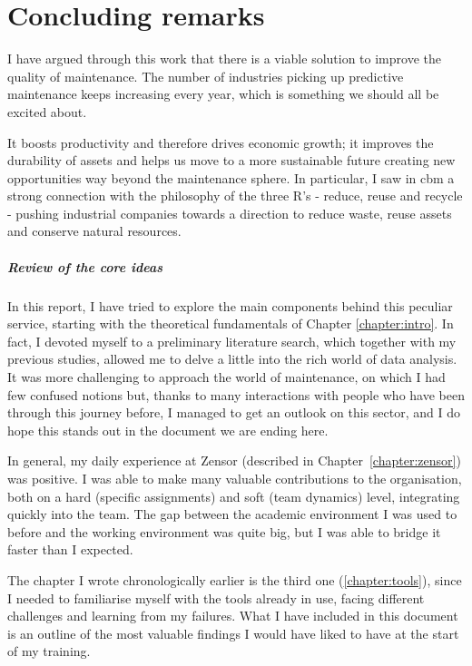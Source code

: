\chapter{Concluding remarks}
I have argued through this work that there is a viable solution to improve the quality of maintenance. %
The number of industries picking up predictive maintenance keeps increasing every year, which is something we should all be excited about. 

It boosts productivity and therefore drives economic growth; it improves the durability of assets and helps us move to a more sustainable future creating new opportunities way beyond the maintenance sphere.
In particular, I saw in \acl{cbm} a strong connection with the philosophy of the three R's - reduce, reuse and recycle - pushing industrial companies towards a direction to reduce waste, reuse assets and conserve natural resources. 

\paragraph{Review of the core ideas}
In this report, I have tried to explore the main components behind this peculiar service, starting with the theoretical fundamentals of Chapter \ref{chapter:intro}. 
In fact, I devoted myself to a preliminary literature search, which together with my previous studies, allowed me to delve a little into the rich world of data analysis. 
It was more challenging to approach the world of maintenance, on which I had few confused notions but, thanks to many interactions with people who have been through this journey before, 
I managed to get an outlook on this sector, and I do hope this stands out in the document we are ending here.

In general, my daily experience at Zensor (described in Chapter~\ref{chapter:zensor}) was positive. I was able to make many valuable contributions to the organisation, both on a hard (specific assignments) and soft (team dynamics) level, integrating quickly into the team. 
The gap between the academic environment I was used to before and the working environment was quite big, but I was able to bridge it faster than I expected.

The chapter I wrote chronologically earlier is the third one (\ref{chapter:tools}), since I needed to familiarise myself with the tools already in use, facing different challenges and learning from my failures.
What I have included in this document is an outline of the most valuable findings I would have liked to have at the start of my training.

